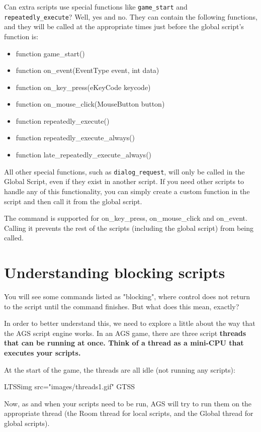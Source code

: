 Can extra scripts use special functions like \verb$game_start$ and \verb$repeatedly_execute$?
Well, yes and no. They can contain the following functions, and they will
be called at the appropriate times just before the global script's function is:
\begin{itemize}
\item function game_start()
\item function on_event(EventType event, int data)
\item function on_key_press(eKeyCode keycode)
\item function on_mouse_click(MouseButton button)
\item function repeatedly_execute()
\item function repeatedly_execute_always()
\item function late_repeatedly_execute_always()
\end{itemize}
All other special functions, such as \verb$dialog_request$, will only be called in
the Global Script, even if they exist in another script. If you need other scripts to
handle any of this functionality, you can simply create a custom function in the
script and then call it from the global script.

The  command is supported for on_key_press, on_mouse_click
and on_event. Calling it prevents the rest of the scripts (including the global script) from being called.


\section{Understanding blocking scripts}\label{BlockingScripts}%

You will see some commands listed as "blocking", where control does not return
to the script until the command finishes. But what does this mean, exactly?

In order to better understand this, we need to explore a little about the way
that the AGS script engine works. In an AGS game, there are three script \bf{threads}
that can be running at once. Think of a thread as a mini-CPU that executes your scripts.

At the start of the game, the threads are all idle (not running any scripts):

LTSSimg src="images/threads1.gif" GTSS

Now, as and when your scripts need to be run, AGS will try to run them on the
appropriate thread (the Room thread for local scripts, and the Global thread
for global scripts).

